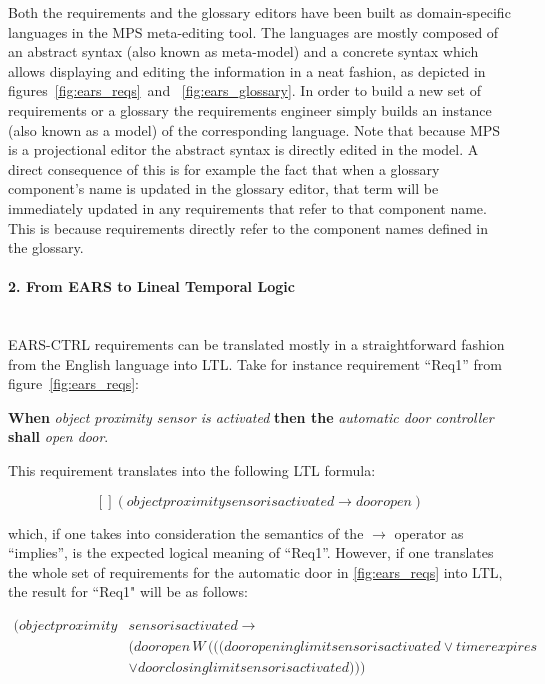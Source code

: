 Both the requirements and the glossary editors have been built as
domain-specific languages in the MPS meta-editing tool. The languages are mostly
composed of an abstract syntax (also known as meta-model) and a concrete syntax
which allows displaying and editing the information in a neat fashion, as
depicted in figures~\ref{fig:ears_reqs} and ~\ref{fig:ears_glossary}. In order
to build a new set of requirements or a glossary the requirements engineer
simply builds an instance (also known as a model) of the corresponding language.
Note that because MPS is a projectional editor the abstract syntax is directly
edited in the model. A direct consequence of this is for example the fact that
when a glossary component's name is updated in the glossary editor, that term
will be immediately updated in any requirements that refer to that component
name. This is because requirements directly refer to the component names defined
in the glossary.

\paragraph{2. From EARS to Lineal Temporal Logic\\\\}

\textsf{EARS-CTRL} requirements can be translated mostly in a straightforward
fashion from the English language into LTL. Take for instance requirement
``Req1'' from figure~\ref{fig:ears_reqs}:

\begin{center}
\textbf{When} \emph{object proximity sensor is activated} \textbf{then the} \emph{automatic door controller} \textbf{shall}
\emph{open door}.
\end{center}

 This requirement translates into the following LTL formula:
 
 $$[] (objectproximitysensorisactivated \rightarrow dooropen)$$
 
 which, if one takes into consideration the semantics of the $\rightarrow$
 operator as ``implies'', is the expected logical meaning of ``Req1''. However,
 if one translates the whole set of requirements for the automatic door in
 \ref{fig:ears_reqs} into LTL, the result for ``Req1" will be as follows:

\begin{align*}
[] (objectproximity&sensorisactivated \rightarrow\\
 &(dooropen\,W\,(((dooropeninglimitsensorisactivated \lor timerexpires\\
 & \lor doorclosinglimitsensorisactivated )))
\end{align*}
 

